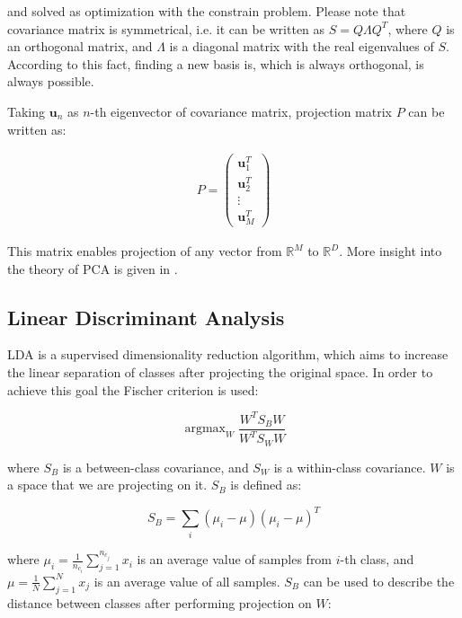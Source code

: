 \documentclass[a4paper, 10 pt, journal]{ieeeconf}
\newcommand{\bb}{\textbf}
\DeclareMathOperator*{\argmax}{argmax}
\begin{document}
and solved as optimization with the constrain problem. Please note that covariance matrix is symmetrical, i.e. it can be written as $S = Q \Lambda Q^{T}$, where $Q$ is an orthogonal matrix, and $\Lambda$ is a diagonal matrix with the real eigenvalues of $S$. According to this fact, finding a new basis is, which is always orthogonal, is always possible.

Taking $\bb{u}_{n}$ as $n$-th eigenvector of covariance matrix, projection matrix $P$ can be written as:

\begin{align}
	P =
	\left( \begin{array}{l}
		\bb{u}_1^T \\
		\bb{u}_2^T \\
		\vdots	 \\
		\bb{u}_M^T
	\end{array} \right)
\end{align}

This matrix enables projection of any vector from $\mathbb{R}^M$ to $\mathbb{R}^D$.
More insight into the theory of PCA is given in \cite{Pattern_recognition}.

\subsection{Linear Discriminant Analysis}

LDA is a supervised dimensionality reduction algorithm, which aims to increase the linear separation of classes after projecting the original space. In order to achieve this goal the Fischer criterion is used:

\begin{equation}
    \argmax_{W} \frac{W^{T} S_{B} W}{W^{T} S_{W} W}
    \label{eq:Fischer_criterion}
\end{equation}

where $S_{B}$ is a between-class covariance, and $S_{W}$ is a within-class covariance. $W$ is a space that we are projecting on it. $S_{B}$ is defined as:

\begin{equation}
    S_B = \sum_{i} (\mu_{i} - \mu)(\mu_{i} - \mu)^{T}
\end{equation}

where $\mu_i = \frac{1}{n_{c_i}} \sum_{j=1}^{n_{c_j}} x_i$ is an average value of samples from $i$-th class, and $\mu = \frac{1}{N} \sum_{j=1}^{N} x_j$ is an average value of all samples. $S_B$ can be used to describe the distance between classes after performing projection on $W$:
\end{document}
